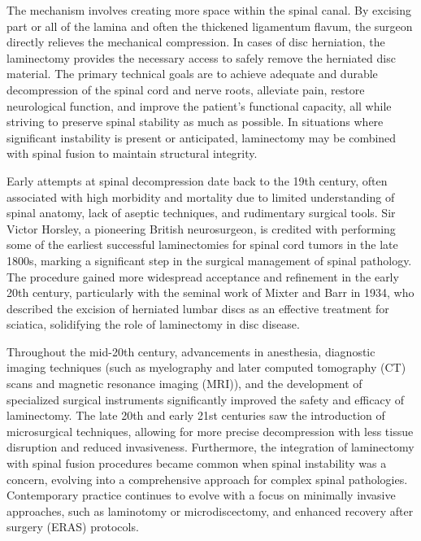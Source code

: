 The mechanism involves creating more space within the spinal canal. By excising part or all of the lamina and often the thickened ligamentum flavum, the surgeon directly relieves the mechanical compression. In cases of disc herniation, the laminectomy provides the necessary access to safely remove the herniated disc material. The primary technical goals are to achieve adequate and durable decompression of the spinal cord and nerve roots, alleviate pain, restore neurological function, and improve the patient's functional capacity, all while striving to preserve spinal stability as much as possible. In situations where significant instability is present or anticipated, laminectomy may be combined with spinal fusion to maintain structural integrity.

Early attempts at spinal decompression date back to the 19th century, often associated with high morbidity and mortality due to limited understanding of spinal anatomy, lack of aseptic techniques, and rudimentary surgical tools. Sir Victor Horsley, a pioneering British neurosurgeon, is credited with performing some of the earliest successful laminectomies for spinal cord tumors in the late 1800s, marking a significant step in the surgical management of spinal pathology. The procedure gained more widespread acceptance and refinement in the early 20th century, particularly with the seminal work of Mixter and Barr in 1934, who described the excision of herniated lumbar discs as an effective treatment for sciatica, solidifying the role of laminectomy in disc disease.

Throughout the mid-20th century, advancements in anesthesia, diagnostic imaging techniques (such as myelography and later computed tomography (CT) scans and magnetic resonance imaging (MRI)), and the development of specialized surgical instruments significantly improved the safety and efficacy of laminectomy. The late 20th and early 21st centuries saw the introduction of microsurgical techniques, allowing for more precise decompression with less tissue disruption and reduced invasiveness. Furthermore, the integration of laminectomy with spinal fusion procedures became common when spinal instability was a concern, evolving into a comprehensive approach for complex spinal pathologies. Contemporary practice continues to evolve with a focus on minimally invasive approaches, such as laminotomy or microdiscectomy, and enhanced recovery after surgery (ERAS) protocols.

